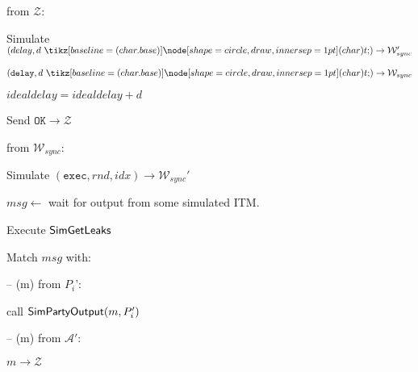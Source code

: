 \begin{bbox}[title={Simulator $\mathcal{S}_{bracha} (\mathcal{D}, \mathcal{P}, \Delta)$}]
\OnInput {} from $\mathcal{Z}$:
	\begin{renumerate}
	\item Simulate $(delay, d \token) \rightarrow \mathcal{W}_{sync}'$

	\item \Send $(\texttt{delay}, d \token) \rightarrow \mathcal{W}_{sync}$

	\item $idealdelay = idealdelay + d$

	\item Send $\texttt{OK} \rightarrow \mathcal{Z}$
	\end{renumerate}

\OnInput {} from $\mathcal{W}_{sync}$:
	\begin{renumerate}
	\item Simulate $(\texttt{exec}, rnd, idx) \rightarrow \mathcal{W}_{sync}'$

	\item $msg \leftarrow$ wait for output from some simulated ITM.

	\item Execute ${\mathsf {SimGetLeaks}}$

	\item Match $msg$ with:

-- \OnInput (m) from $P_i$':
  
	\qquad call ${\mathsf {SimPartyOutput}}(m, P_i')$

-- \OnInput (m) from $\mathcal{A}'$:

	\qquad \Send $m \rightarrow \mathcal{Z}$

	\end{renumerate}

\end{bbox}

